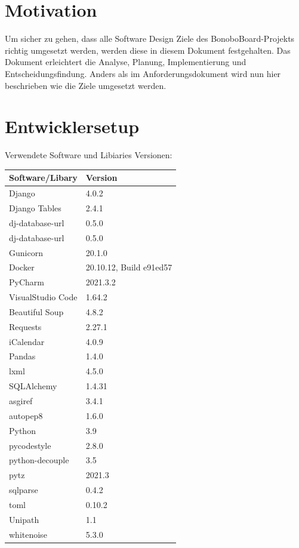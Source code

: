 \documentclass[a4paper,11pt]{scrartcl}
\begin{document}



\section{Motivation}
Um sicher zu gehen, dass alle Software Design Ziele des BonoboBoard-Projekts richtig umgesetzt werden, werden diese in diesem Dokument festgehalten. Das Dokument erleichtert die Analyse, Planung, Implementierung und Entscheidungsfindung. Anders als im Anforderungsdokument wird nun hier beschrieben wie die Ziele umgesetzt werden. 


\section{Entwicklersetup}
Verwendete Software und Libiaries Versionen:
\begin{table}[H]
\begin{tabular}{|p{4cm}|p{8cm}|}
\hline
\textbf{Software/Libary} & \textbf{Version} \\ \hline
	Django &  4.0.2\\ \hline
	Django Tables & 2.4.1 \\ \hline
	dj-database-url & 0.5.0 \\ \hline
	dj-database-url & 0.5.0 \\ \hline
	Gunicorn & 20.1.0 \\ \hline
	Docker & 20.10.12, Build e91ed57 \\ \hline
	PyCharm & 2021.3.2 \\ \hline
	VisualStudio Code & 1.64.2 \\ \hline
	Beautiful Soup & 4.8.2 \\ \hline
	Requests & 2.27.1 \\ \hline
	iCalendar & 4.0.9 \\ \hline
	Pandas & 1.4.0 \\ \hline
	lxml & 4.5.0 \\ \hline
	SQLAlchemy & 1.4.31 \\ \hline
	asgiref & 3.4.1 \\ \hline
	autopep8 & 1.6.0 \\ \hline
	Python & 3.9 \\ \hline
	pycodestyle & 2.8.0 \\ \hline
	python-decouple & 3.5 \\ \hline
	pytz & 2021.3 \\ \hline
	sqlparse & 0.4.2 \\ \hline
	toml & 0.10.2 \\ \hline
	Unipath & 1.1 \\ \hline
	whitenoise & 5.3.0 \\ \hline
\end{tabular}
\end{table}
\end{document}
